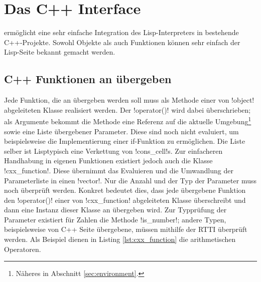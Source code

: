 \section{Das C++ Interface}
\label{sec:cxx_interface}

\projectname{} ermöglicht eine sehr einfache Integration des Lisp-Interpreters in bestehende C++-Projekte. Sowohl Objekte als auch Funktionen können sehr einfach der Lisp-Seite bekannt gemacht werden.

\subsection{C++ Funktionen an \projectname{} übergeben}
\label{sec:cxx_function_interface}

Jede Funktion, die an \projectname{} übergeben werden soll muss als Methode einer von !object! abgeleiteten Klasse realisiert werden. Der !operator()! wird dabei überschrieben; als Argumente bekommt die Methode eine Referenz auf die aktuelle Umgebung\footnote{Näheres in Abschnitt \ref{sec:environment}.} sowie eine Liste übergebener Parameter. Diese sind noch nicht evaluiert, um beispielsweise die Implementierung einer if-Funktion zu ermöglichen. Die Liste selber ist Lisptypisch eine Verkettung von !cons_cell!s. Zur einfacheren Handhabung in eigenen Funktionen existiert jedoch auch die Klasse !cxx_function!. Diese übernimmt das Evaluieren und die Umwandlung der Parameterliste in einen !vector!. Nur die Anzahl und der Typ der Parameter muss noch überprüft werden. Konkret bedeutet dies, dass jede übergebene Funktion den !operator()! einer von !cxx_function! abgeleiteten Klasse überschreibt und dann eine Instanz dieser Klasse an \projectname{} übergeben wird. Zur Typprüfung der Parameter existiert für Zahlen die Methode !is_number!; andere Typen, beispielsweise von C++ Seite übergebene, müssen mithilfe der RTTI überprüft werden. Als Beispiel dienen in Listing \ref{lst:cxx_function} die arithmetischen Operatoren.
